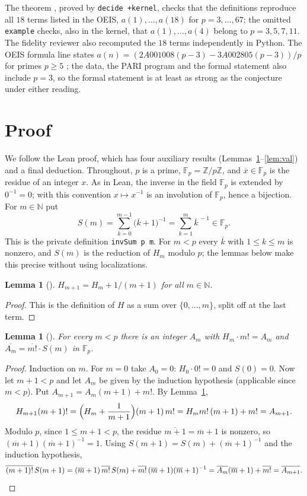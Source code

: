 \documentclass[11pt]{amsart}
\theoremstyle{plain}
\newtheorem{lemma}[theorem]{Lemma}
\theoremstyle{definition}
\newcommand{\N}{\mathbb{N}}
\newcommand{\Z}{\mathbb{Z}}
\newcommand{\F}{\mathbb{F}_p}
\newcommand{\res}[1]{\overline{#1}}
\begin{document}
The theorem , proved by \texttt{decide +kernel}, checks that the definitions reproduce all $18$ terms listed in the OEIS, $a(1),\dots,a(18)$ for $p=3,\dots,67$; the omitted \texttt{example} checks, also in the kernel, that $a(1),\dots,a(4)$ belong to $p=3,5,7,11$. The fidelity reviewer also recomputed the $18$ terms independently in Python. The OEIS formula line states $a(n)=(2A001008(p-3)-3A002805(p-3))/p$ for primes $p\ge5$ \cite{A001008,A002805}; the data, the PARI program and the formal statement also include $p=3$, so the formal statement is at least as strong as the conjecture under either reading.

\section{Proof}\label{sec:proof}

We follow the Lean proof, which has four auxiliary results (Lemmas~\ref{lem:succ}--\ref{lem:val}) and a final deduction. Throughout, $p$ is a prime, $\F=\Z/p\Z$, and $\res x\in\F$ is the residue of an integer $x$. As in Lean, the inverse in the field $\F$ is extended by $0^{-1}=0$; with this convention $x\mapsto x^{-1}$ is an involution of $\F$, hence a bijection. For $m\in\N$ put
\[
  S(m)=\sum_{k=0}^{m-1}\bigl(\res k+1\bigr)^{-1}=\sum_{k=1}^{m}\res{k}^{\,-1}\in\F .
\]
This is the private definition \texttt{invSum p m}. For $m<p$ every $\res k$ with $1\le k\le m$ is nonzero, and $S(m)$ is the reduction of $H_m$ modulo $p$; the lemmas below make this precise without using localizations.

\begin{lemma}[]\label{lem:succ}
$H_{m+1}=H_m+1/(m+1)$ for all $m\in\N$.
\end{lemma}

\begin{proof}
This is the definition of $H$ as a sum over $\{0,\dots,m\}$, split off at the last term.
\end{proof}

\begin{lemma}[]\label{lem:key}
For every $m<p$ there is an integer $A_m$ with $H_m\cdot m!=A_m$ and $\res{A_m}=\res{m!}\cdot S(m)$ in $\F$.
\end{lemma}

\begin{proof}
Induction on $m$. For $m=0$ take $A_0=0$: $H_0\cdot0!=0$ and $S(0)=0$. Now let $m+1<p$ and let $A_m$ be given by the induction hypothesis (applicable since $m<p$). Put $A_{m+1}=A_m(m+1)+m!$. By Lemma~\ref{lem:succ},
\[
  H_{m+1}(m+1)!=\Bigl(H_m+\frac1{m+1}\Bigr)(m+1)\,m!=H_m m!\,(m+1)+m!=A_{m+1}.
\]
Modulo $p$, since $1\le m+1<p$, the residue $\res{m+1}=\res m+1$ is nonzero, so $(\res m+1)(\res m+1)^{-1}=1$. Using $S(m+1)=S(m)+(\res m+1)^{-1}$ and the induction hypothesis,
\[
  \res{(m+1)!}\,S(m+1)=(\res m+1)\,\res{m!}\,S(m)+\res{m!}\,(\res m+1)(\res m+1)^{-1}
  =\res{A_m}(\res m+1)+\res{m!}=\res{A_{m+1}}.\qedhere
\]
\end{proof}
\end{document}
